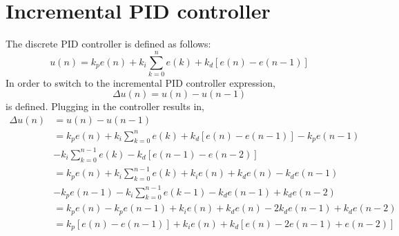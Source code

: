 \section{Incremental PID controller}
The discrete PID controller is defined as follows:
\begin{equation}
    u(n)=k_p e(n)+k_i\sum_{k=0}^{n}e(k)+k_d[e(n)-e(n-1)]
\end{equation}
In order to switch to the incremental PID controller expression,
\begin{equation}
    \Delta u(n)=u(n)-u(n-1)
\end{equation}
is defined. Plugging in the controller results in,
\begin{equation}
\begin{split}
    \Delta u(n)&=u(n)-u(n-1)\\
    &=k_p e(n)+k_i\sum_{k=0}^{n}e(k)+k_d[e(n)-e(n-1)]-k_p e(n-1)\\
     &-k_i\sum_{k=0}^{n-1}e(k)-k_d[e(n-1)-e(n-2)]\\
    &=k_p e(n)+k_i\sum_{k=0}^{n-1}e(k)+k_ie(n)+k_de(n)-k_de(n-1)\\
    &-k_p e(n-1)-k_i\sum_{k=0}^{n-1}e(k-1)-k_de(n-1)+k_de(n-2)\\
    &=k_p e(n)-k_p e(n-1)+k_ie(n)+k_de(n)-2k_de(n-1)+k_de(n-2)\\
    &=k_p [e(n)-e(n-1)]+k_ie(n)+k_d[e(n)-2e(n-1)+e(n-2)]
\end{split}
\end{equation}

